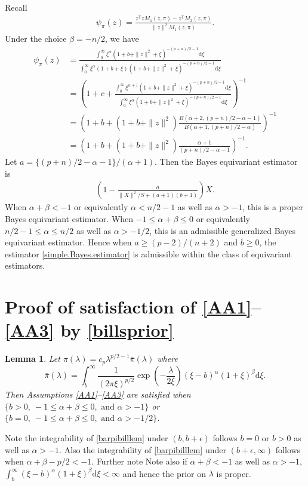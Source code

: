 \documentclass[preprint,11pt]{imsart}
\numberwithin{equation}{section}
\theoremstyle{plain}
\newtheorem{lemma}{Lemma}[section]
\theoremstyle{definition}
\theoremstyle{remark}
\def\T{{ \mathrm{\scriptscriptstyle T} }}
\newcommand{\rd}{\mathrm{d}}
\begin{document}
Recall
\begin{align*}
  \psi_\pi(z)=\frac{z^\T z M_1(z,\pi)- z^\T M_2(z,\pi)}{\|z\|^2 M_1(z,\pi)}.
\end{align*}
Under the choice $\beta=-n/2$, we have
\begin{align*}
 \psi_\pi(z)&=
 \frac{\int_0^\infty\xi^\alpha(1+ b +\|z\|^2+\xi)^{-(p+n)/2-1}\rd\xi}
 {\int_0^\infty\xi^\alpha(1+ b +\xi)(1+ b +\|z\|^2+\xi)^{-(p+n)/2-1}\rd\xi} \\
 &=\left(1+c+\frac{\int_0^\infty\xi^{\alpha+1}(1+ b +\|z\|^2+\xi)^{-(p+n)/2-1}\rd\xi}
 {\int_0^\infty\xi^\alpha(1+ b +\|z\|^2+\xi)^{-(p+n)/2-1}\rd\xi}\right)^{-1} \\
 &=\left(1+ b +(1+ b +\|z\|^2)\frac{B(\alpha+2,(p+n)/2-\alpha-1)}{B(\alpha+1,(p+n)/2-\alpha)}
\right)^{-1} \\
 &=\left(1+ b +(1+ b +\|z\|^2)\frac{\alpha+1}{(p+n)/2-\alpha-1}
 \right)^{-1}.
\end{align*}
Let $a=\{(p+n)/2-\alpha-1\}/(\alpha+1)$.
Then the Bayes equivariant estimator is
\begin{align}\label{simple.Bayes.estimator}
 \left(1-\frac{a}{\|X\|^2/S+(a+1) (b+1)}\right)X.
\end{align}
When $\alpha+\beta<-1$ or equivalently $ \alpha<n/2-1$ as well as $\alpha>-1$,
this is a proper Bayes equivariant estimator.
When $-1\leq \alpha+\beta\leq 0$ or equivalently
$n/2-1\leq \alpha\leq n/2$ as well as $\alpha>-1/2$,
this is an admissible generalized Bayes equivariant estimator.
Hence when $a\geq (p-2)/(n+2)$ and $b\geq 0$,
the estimator \eqref{simple.Bayes.estimator} is admissible within the class of
equivariant estimators.
 
 \section{Proof of satisfaction of \ref{AA1}--\ref{AA3} by \eqref{billsprior}}
 \label{bill-1971}
\begin{lemma}
 Let $\pi(\lambda)=c_p\lambda^{p/2-1}\bar{\pi}(\lambda)$ where
 \begin{equation}\label{barpibilllem}
  \bar{\pi}(\lambda)=\int_b^\infty\frac{1}{(2\pi\xi)^{p/2}}\exp\left(-\frac{\lambda}{2\xi}\right)
  (\xi-b)^\alpha(1+\xi)^\beta\rd \xi.
 \end{equation}  
 Then Assumptions \ref{AA1}--\ref{AA3} are satisfied when
 $\{b>0,\ -1\leq \alpha+\beta\leq 0,\text{ and }\alpha>-1\} $ or
$\{b=0,\ -1\leq \alpha+\beta\leq 0,\text{ and }\alpha>-1/2\} $.
\end{lemma}
Note the integrability of \eqref{barpibilllem} under $(b,b+\epsilon)$ follows
$b=0$ or $b>0$ as well as $\alpha>-1$.
Also the integrability of \eqref{barpibilllem} under $(b+\epsilon,\infty)$ follows
when
$\alpha+\beta-p/2<-1$.
Further note Note also if $\alpha+\beta< -1$ as well as $\alpha>-1$, 
$\int_b^\infty(\xi-b)^\alpha(1+\xi)^\beta\rd \xi<\infty$ and hence the prior on $\lambda$ is proper.
\end{document}
